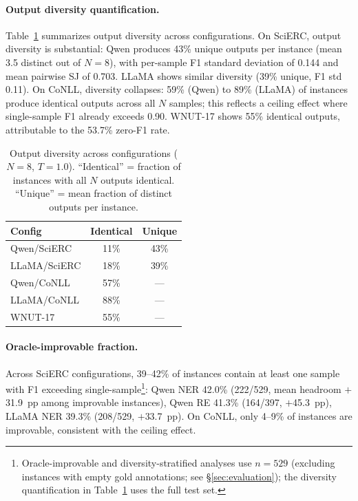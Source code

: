 
\paragraph{Output diversity quantification.}
Table~\ref{tab:diversity} summarizes output diversity across configurations.
On SciERC, output diversity is substantial: Qwen produces 43\% unique outputs per instance (mean 3.5 distinct out of $N{=}8$), with per-sample F1 standard deviation of 0.144 and mean pairwise SJ of 0.703.
LLaMA shows similar diversity (39\% unique, F1 std 0.11).
On CoNLL, diversity collapses: 59\% (Qwen) to 89\% (LLaMA) of instances produce identical outputs across all $N$ samples; this reflects a ceiling effect where single-sample F1 already exceeds 0.90.
WNUT-17 shows 55\% identical outputs, attributable to the 53.7\% zero-F1 rate.

\begin{table}[t]
\centering
\small
\caption{Output diversity across configurations ($N{=}8$, $T{=}1.0$). ``Identical'' = fraction of instances with all $N$ outputs identical. ``Unique'' = mean fraction of distinct outputs per instance.}
\label{tab:diversity}
\begin{tabular}{lcc}
\toprule
Config & Identical & Unique \\
\midrule
Qwen/SciERC & 11\% & 43\% \\
LLaMA/SciERC & 18\% & 39\% \\
Qwen/CoNLL & 57\% & --- \\
LLaMA/CoNLL & 88\% & --- \\
WNUT-17 & 55\% & --- \\
\bottomrule
\end{tabular}
\end{table}

\paragraph{Oracle-improvable fraction.}
Across SciERC configurations, 39--42\% of instances contain at least one sample with F1 exceeding single-sample\footnote{Oracle-improvable and diversity-stratified analyses use $n{=}529$ (excluding instances with empty gold annotations; see \S\ref{sec:evaluation}); the diversity quantification in Table~\ref{tab:diversity} uses the full test set.}: Qwen NER 42.0\% (222/529, mean headroom $+$31.9~pp among improvable instances), Qwen RE 41.3\% (164/397, $+$45.3~pp), LLaMA NER 39.3\% (208/529, $+$33.7~pp).
On CoNLL, only 4--9\% of instances are improvable, consistent with the ceiling effect.

